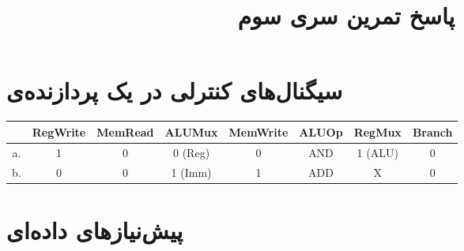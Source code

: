 \documentclass[11pt, dvipsnames, svgnames, x11names]{article}
\title{پاسخ تمرین سری سوم}
\date{}
\begin{document}
\maketitle
\tableofcontents
\newpage
\section{سیگنال‌های کنترلی در یک پردازنده‌ی }
\begin{latin}
\begin{table}[H]
\begin{adjustbox}{width=\textwidth}
\begin{tabular}{|c|c|c|c|c|c|c|c|}
\hline
&
RegWrite &
MemRead&
ALUMux&
MemWrite&
ALUOp&
RegMux&
Branch\\
\hline
\hline
a. &
1 &
0 &
0 (Reg)&
0 &
AND &
1 (ALU)&
0 \\
\hline
b. &
0 &
0 &
1 (Imm)&
1 &
ADD &
X &
0 \\
\hline
\end{tabular}
\end{adjustbox}
\end{table}
\end{latin}

\section{پیش‌نیاز‌‌های داده‌ای}
\end{document}
